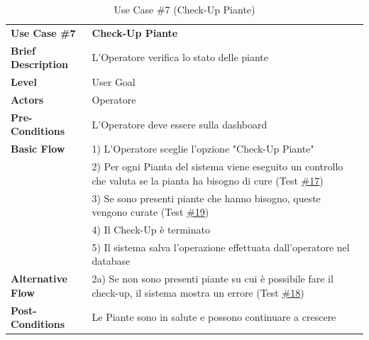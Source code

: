 \documentclass{article}
\begin{document}
    \begin{table}[p]
        \begin{tabularx}{\textwidth}{ | l  X | }
            \rowcolor{lightgray!70}
            \hline
            \textbf{Use Case \#7} & \textbf{Check-Up Piante }\\[0.5ex]
            \textbf{Brief Description} & L'Operatore verifica lo stato delle piante\\
            \rowcolor{blue!10}
            \textbf{Level} & User Goal\\
            \textbf{Actors} & Operatore \\
            \rowcolor{blue!10}
            \textbf{Pre-Conditions} & L'Operatore deve essere sulla dashboard\\
            \textbf{Basic Flow} & 1) L'Operatore sceglie l'opzione "Check-Up Piante"\\
            & 2) Per ogni Pianta del sistema viene eseguito un controllo che valuta se la pianta ha bisogno di cure (Test \hyperref[test_17]{\#17})\\
            & 3) Se sono presenti piante che hanno bisogno, queste vengono curate (Test \hyperref[test_19]{\#19})\\
            & 4) Il Check-Up è terminato\\
            & 5) Il sistema salva l'operazione effettuata dall'operatore nel database \\
            \rowcolor{blue!10}
            \textbf{Alternative Flow} & 2a) Se non sono presenti piante su cui è possibile fare il check-up, il sistema mostra un errore (Test \hyperref[test_18]{\#18})\\
            \textbf{Post-Conditions} & Le Piante sono in salute e possono continuare a crescere\\
            \hline
        \end{tabularx}
        \label{use_case_7}
        \caption{Use Case \#7 (Check-Up Piante)}
    \end{table}
    
\end{document}
